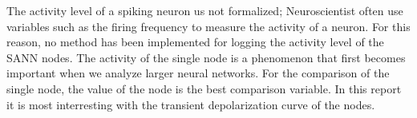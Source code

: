 \documentclass[b5paper,11 pt]{report}
\begin{document}
	The activity level of a spiking neuron us not formalized; Neuroscientist often use variables such as the firing frequency to measure the activity of a neuron.
	For this reason, no method has been implemented for logging the activity level of the SANN nodes.
	The activity of the single node is a phenomenon that first becomes important when we analyze larger neural networks.
	For the comparison of the single node, the value of the node is the best comparison variable. 
	In this report it is most interresting with the transient depolarization curve of the nodes.


	

	






\appendix
	
	
	
	
	


%

\end{document}
